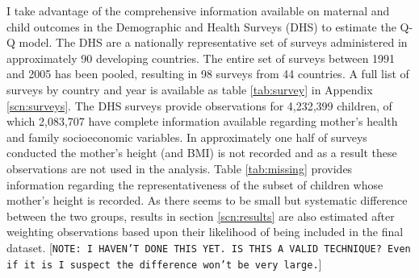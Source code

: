 \documentclass{article}[11pt,subeqn]
\begin{document}
\begin{spacing}{1.25}
I take advantage of the comprehensive information available on maternal and child outcomes in the Demographic and Health Surveys (DHS) to estimate the Q-Q model.  The DHS are a nationally representative set of surveys administered in approximately 90 developing countries.  The entire set of surveys between 1991 and 2005 has been pooled, resulting in 98 surveys from 44 countries.  A full list of surveys by country and year is available as table \ref{tab:survey} in Appendix \ref{scn:surveys}.  The DHS surveys provide observations for 4,232,399 children, of which 2,083,707 have complete information available regarding mother's health and family socioeconomic variables.  In approximately one half of surveys conducted the mother's height (and BMI) is not recorded and as a result these observations are not used in the analysis. Table \ref{tab:missing} provides information regarding the representativeness of the subset of children whose mother's height is recorded.  As there seems to be small but systematic difference between the two groups, results in section \ref{scn:results} are also estimated after weighting observations based upon their likelihood of being included in the final dataset. [\texttt{NOTE: I HAVEN'T DONE THIS YET.  IS THIS A VALID TECHNIQUE?  Even if it is I suspect the difference won't be very large.}]


\end{spacing}
\end{document}
